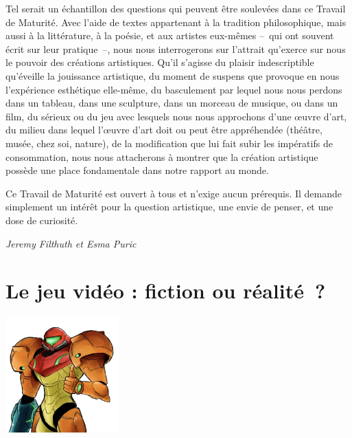 \documentclass[
  10pt,
  french,
  a5paper,
  openany]{book}
\newenvironment{signature}{\begin{flushright}}{\end{flushright}}
\begin{document}
Tel serait un échantillon des questions qui peuvent être soulevées dans ce Travail de Maturité. Avec l'aide de textes appartenant à la tradition philosophique, mais aussi à la littérature, à la poésie, et aux artistes eux-mêmes --~qui ont souvent écrit sur leur pratique~--, nous nous interrogerons sur l'attrait qu'exerce sur nous le pouvoir des créations artistiques. Qu'il s'agisse du plaisir indescriptible qu'éveille la jouissance artistique, du moment de suspens que provoque en nous l'expérience esthétique elle-même, du basculement par lequel nous nous perdons dans un tableau, dans une sculpture, dans un morceau de musique, ou dans un film, du sérieux ou du jeu avec lesquels nous nous approchons d'une œuvre d'art, du milieu dans lequel l'œuvre d'art doit ou peut être appréhendée (théâtre, musée, chez soi, nature), de la modification que lui fait subir les impératifs de consommation, nous nous attacherons à montrer que la création artistique possède une place fondamentale dans notre rapport au monde.

Ce Travail de Maturité est ouvert à tous et n'exige aucun prérequis. Il demande simplement un intérêt pour la question artistique, une envie de penser, et une dose de curiosité.

\begin{signature}
\emph{Jeremy Filthuth et Esma Puric}

\end{signature}

\hypertarget{le-jeu-viduxe9o-fiction-ou-ruxe9alituxe9}{%
\chapter{Le jeu vidéo : fiction ou réalité~?}\label{le-jeu-viduxe9o-fiction-ou-ruxe9alituxe9}}


\begin{center}
\includegraphics[width=\textwidth,height=12em]{images/le-jeu-video-fiction-ou-realite.jpg}

\end{center}
\end{document}
